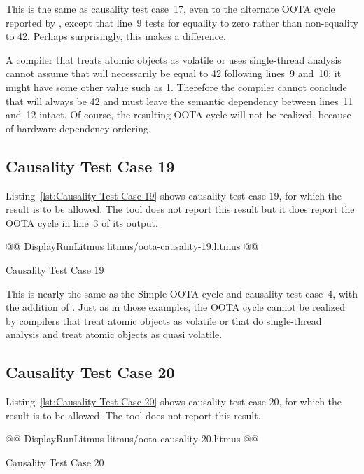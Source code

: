 \documentclass[10]{article}
\begin{document}
This is the same as causality test case~17, even to the alternate OOTA
cycle reported by , except that line~9 tests
 for equality to zero rather than non-equality to 42.
Perhaps surprisingly, this makes a difference.

A compiler that treats atomic objects as volatile or uses
single-thread analysis cannot assume that  will necessarily be
equal to 42 following lines~9 and~10; it might have some other value
such as 1.
Therefore the compiler cannot conclude that  will always be 42
and must leave the semantic dependency between lines~11 and~12 intact.
Of course, the resulting OOTA cycle will not be realized, because of
hardware dependency ordering.

\subsection{Causality Test Case 19}
\label{app:Causality Test Case 19}

Listing~\ref{lst:Causality Test Case 19}
shows causality test case 19, for which the 
result is to be allowed.
The  tool does not report this result but it does report the
OOTA cycle in line~3 of its output.

\begin{listing}[tbp]
@@ DisplayRunLitmus litmus/oota-causality-19.litmus @@
\caption{Causality Test Case 19}
\label{lst:Causality Test Case 19}
\end{listing}

This is nearly the same as the Simple OOTA cycle and causality test
case~4, with the addition of .
Just as in those examples, the OOTA cycle cannot be realized by
compilers that treat atomic objects as volatile or that do
single-thread analysis and treat atomic objects as quasi volatile.

\subsection{Causality Test Case 20}
\label{app:Causality Test Case 20}

Listing~\ref{lst:Causality Test Case 20}
shows causality test case 20, for which the 
result is to be allowed.
The  tool does not report this result.

\begin{listing}[tbp]
@@ DisplayRunLitmus litmus/oota-causality-20.litmus @@
\caption{Causality Test Case 20}
\label{lst:Causality Test Case 20}
\end{listing}
\end{document}
